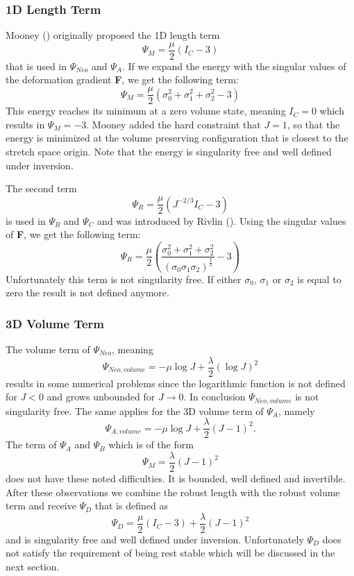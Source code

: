 \subsubsection{1D Length Term}
Mooney (\cite{mooney1940theory}) originally proposed the 1D length term 
\[
\Psi_{M}=\frac{\mu}{2}\left(I_{C}-3\right)
\]
that is used in $\Psi_{Neo}$ and $\Psi_{A}$. If we expand the energy with the singular values of the deformation gradient \textbf{F}, we get the following term:
\[
\Psi_{M}=\frac{\mu}{2}\left(\sigma_{0}^2 + \sigma_{1}^2 + \sigma_{2}^2 - 3\right)
\]
This energy reaches its minimum at a zero volume state, meaning $I_{C}=0$ which results in $\Psi_{M}=-3$. Mooney added the hard constraint that $J=1$, so that the energy is minimized at the volume preserving configuration that is closest to the stretch space origin. Note that the energy is singularity free and well defined under inversion.

The second term 
\[
\Psi_{R} = \frac{\mu}{2}\left(J^{-2 / 3} I_{C}-3\right)
\]
is used in $\Psi_{B}$ and $\Psi_{C}$ and was introduced by Rivlin (\cite{rivlin1948large}). Using the singular values of \textbf{F}, we get the following term:
\[
\Psi_{R} = \frac{\mu}{2}\left(\frac{\sigma_{0}^2 + \sigma_{1}^2 + \sigma_{2}^2}{(\sigma_{0}  \sigma_{1}  \sigma_{2})^\frac{2}{3}}
 - 3\right)
\]
Unfortunately this term is not singularity free. If either $\sigma_{0}$, $\sigma_{1}$ or $\sigma_{2}$ is equal to zero the result is not defined anymore.

\subsubsection{3D Volume Term}
The volume term of $\Psi_{Neo}$, meaning
\[
\Psi_{Neo, volume} = -\mu \log J+\frac{\lambda}{2}(\log J)^{2}
\]
results in some numerical problems since the logarithmic function is not defined for $J<0$ and grows unbounded for $J \rightarrow 0$. In conclusion $\Psi_{Neo, volume}$ is not singularity free. 
The same applies for the 3D volume term of $\Psi_{A}$, namely
\[
\Psi_{A, volume} = -\mu \log J+\frac{\lambda}{2}(J-1)^{2}.
\]
The term of $\Psi_{A}$ and $\Psi_{B}$ which is of the form
\[
\Psi_{M} = \frac{\lambda}{2}(J-1)^{2}
\]
does not have these noted difficulties. It is bounded, well defined and invertible. After these observations we combine the robust length with the robust volume term and receive $\Psi_D$ that is defined as
\[
\Psi_{D} = \frac{\mu}{2}\left(I_{C}-3\right) +\frac{\lambda}{2}(J-1)^{2}
\]
and is singularity free and well defined under inversion. Unfortunately $\Psi_D$ does not satisfy the requirement of being rest stable which will be discussed in the next section.

